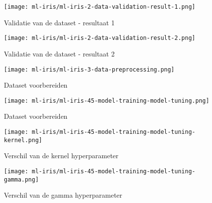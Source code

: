 \clearpage

\begin{figure}[hbt!]
  \centering
  \begin{minipage}{0.5\textwidth}
      \centering
      \texttt{[image: ml-iris/ml-iris-2-data-validation-result-1.png]}
      \caption{Validatie van de dataset - resultaat 1}
      \label{fig:appendix:ml-iris-2-data-validation-result-1}
  \end{minipage}\hfill
  \begin{minipage}{0.5\textwidth}
      \centering
      \texttt{[image: ml-iris/ml-iris-2-data-validation-result-2.png]}
      \caption{Validatie van de dataset - resultaat 2}
      \label{fig:appendix:ml-iris-2-data-validation-result-2}
  \end{minipage}
\end{figure}

\begin{figure}[hbt!]
  \centering
  \texttt{[image: ml-iris/ml-iris-3-data-preprocessing.png]}
  \caption{Dataset voorbereiden}
  \label{fig:appendix:ml-iris-3-data-preprocessing}
\end{figure}

\begin{figure}[hbt!]
  \centering
  \texttt{[image: ml-iris/ml-iris-45-model-training-model-tuning.png]}
  \caption{Dataset voorbereiden}
  \label{fig:ml-iris-45-model-training-model-tuning}
\end{figure}

\clearpage

\begin{figure}[hbt!]
  \centering
  \begin{minipage}{0.45\textwidth}
      \centering
      \texttt{[image: ml-iris/ml-iris-45-model-training-model-tuning-kernel.png]}
      \caption{Verschil van de kernel hyperparameter}
      \label{fig:appendix:ml-iris-45-model-training-model-tuning-kernel}
  \end{minipage}\hfill
  \begin{minipage}{0.45\textwidth}
      \centering
      \texttt{[image: ml-iris/ml-iris-45-model-training-model-tuning-gamma.png]}
      \caption{Verschil van de gamma hyperparameter}
      \label{fig:appendix:ml-iris-45-model-training-model-tuning-gamma}
  \end{minipage}
\end{figure}

\clearpage

